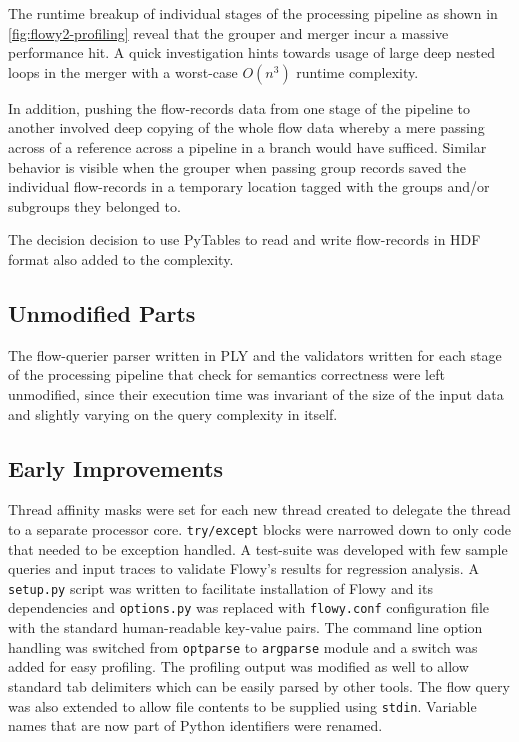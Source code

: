 The runtime breakup of individual stages of the processing pipeline as shown in \ref{fig:flowy2-profiling} reveal that the grouper and merger incur a massive performance hit. A quick investigation hints towards usage of large deep nested loops in the merger with a worst-case $O(n^3)$ runtime complexity.

In addition, pushing the flow-records data from one stage of the pipeline to another involved deep copying of the whole flow data whereby a mere passing across of a reference across a pipeline in a branch would have sufficed. Similar behavior is visible when the grouper when passing group records saved the individual flow-records in a temporary location tagged with the groups and/or subgroups they belonged to.

The decision decision to use PyTables to read and write flow-records in \ac{HDF} format also added to the complexity.

\subsection{Unmodified Parts}\label{subsec:unmodified-parts}
The flow-querier parser written in \ac{PLY} and the validators written for each stage of the processing pipeline that check for semantics correctness were left unmodified, since their execution time was invariant of the size of the input data and slightly varying on the query complexity in itself.

\subsection{Early Improvements}\label{subsec:early-improvements}
Thread affinity masks were set for each new thread created to delegate the thread to a separate processor core. \texttt{try/except} blocks were narrowed down to only code that needed to be exception handled. A test-suite was developed with few sample queries and input traces to validate Flowy's results for regression analysis. A \texttt{setup.py} script was written to facilitate installation of Flowy and its dependencies and \texttt{options.py} was replaced with \texttt{flowy.conf} configuration file with the standard human-readable key-value pairs. The command line option handling was switched from \texttt{optparse} to \texttt{argparse} module and a switch was added for easy profiling. The profiling output was modified as well to allow standard tab delimiters which can be easily parsed by other tools. The flow query was also  extended to allow file contents to be supplied using \texttt{stdin}. Variable names that are now part of Python identifiers were renamed. 

